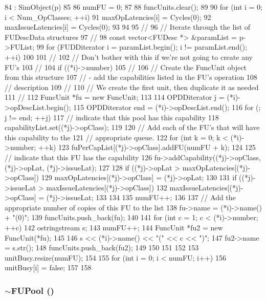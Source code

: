 \begin{DoxyCode}
84     : SimObject(p)
85 {
86     numFU = 0;
87 
88     funcUnits.clear();
89 
90     for (int i = 0; i < Num_OpClasses; ++i) {
91         maxOpLatencies[i] = Cycles(0);
92         maxIssueLatencies[i] = Cycles(0);
93     }
94 
95     //
96     //  Iterate through the list of FUDescData structures
97     //
98     const vector<FUDesc *> &paramList =  p->FUList;
99     for (FUDDiterator i = paramList.begin(); i != paramList.end(); ++i) {
100 
101         //
102         //  Don't bother with this if we're not going to create any FU's
103         //
104         if ((*i)->number) {
105             //
106             //  Create the FuncUnit object from this structure
107             //   - add the capabilities listed in the FU's operation
108             //     description
109             //
110             //  We create the first unit, then duplicate it as needed
111             //
112             FuncUnit *fu = new FuncUnit;
113 
114             OPDDiterator j = (*i)->opDescList.begin();
115             OPDDiterator end = (*i)->opDescList.end();
116             for (; j != end; ++j) {
117                 // indicate that this pool has this capability
118                 capabilityList.set((*j)->opClass);
119 
120                 // Add each of the FU's that will have this capability to the
121                 // appropriate queue.
122                 for (int k = 0; k < (*i)->number; ++k)
123                     fuPerCapList[(*j)->opClass].addFU(numFU + k);
124 
125                 // indicate that this FU has the capability
126                 fu->addCapability((*j)->opClass, (*j)->opLat, (*j)->issueLat);
127 
128                 if ((*j)->opLat > maxOpLatencies[(*j)->opClass])
129                     maxOpLatencies[(*j)->opClass] = (*j)->opLat;
130 
131                 if ((*j)->issueLat > maxIssueLatencies[(*j)->opClass])
132                     maxIssueLatencies[(*j)->opClass] = (*j)->issueLat;
133             }
134 
135             numFU++;
136 
137             //  Add the appropriate number of copies of this FU to the list
138             fu->name = (*i)->name() + "(0)";
139             funcUnits.push_back(fu);
140 
141             for (int c = 1; c < (*i)->number; ++c) {
142                 ostringstream s;
143                 numFU++;
144                 FuncUnit *fu2 = new FuncUnit(*fu);
145 
146                 s << (*i)->name() << "(" << c << ")";
147                 fu2->name = s.str();
148                 funcUnits.push_back(fu2);
149             }
150         }
151     }
152 
153     unitBusy.resize(numFU);
154 
155     for (int i = 0; i < numFU; i++) {
156         unitBusy[i] = false;
157     }
158 }
\end{DoxyCode}
\hypertarget{classFUPool_acab5c3e76b336f001a3d89b08394f0f9}{
\subsubsection[{$\sim$FUPool}]{\setlength{\rightskip}{0pt plus 5cm}$\sim${\bf FUPool} ()}}
\label{classFUPool_acab5c3e76b336f001a3d89b08394f0f9}



